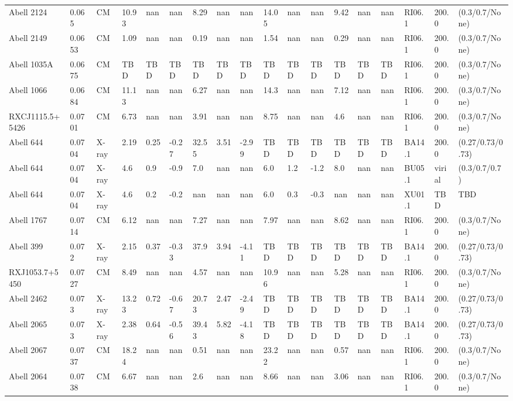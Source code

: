 \documentclass{article}
\begin{document}
\begin{center}
\begin{landscape}
\begin{longtable}{llllllllllllllllll}
Abell 2124 & 0.065 & CM & 10.93 & nan & nan & 8.29 & nan & nan & 14.05 & nan & nan & 9.42 & nan & nan & RI06.1 & 200.0 & (0.3/0.7/None) \\
Abell 2149 & 0.0653 & CM & 1.09 & nan & nan & 0.19 & nan & nan & 1.54 & nan & nan & 0.29 & nan & nan & RI06.1 & 200.0 & (0.3/0.7/None) \\
Abell 1035A & 0.0675 & CM & TBD & TBD & TBD & TBD & TBD & TBD & TBD & TBD & TBD & TBD & TBD & TBD & RI06.1 & 200.0 & (0.3/0.7/None) \\
Abell 1066 & 0.0684 & CM & 11.13 & nan & nan & 6.27 & nan & nan & 14.3 & nan & nan & 7.12 & nan & nan & RI06.1 & 200.0 & (0.3/0.7/None) \\
RXCJ1115.5+5426 & 0.0701 & CM & 6.73 & nan & nan & 3.91 & nan & nan & 8.75 & nan & nan & 4.6 & nan & nan & RI06.1 & 200.0 & (0.3/0.7/None) \\
Abell 644 & 0.0704 & X-ray & 2.19 & 0.25 & -0.27 & 32.55 & 3.51 & -2.99 & TBD & TBD & TBD & TBD & TBD & TBD & BA14.1 & 200.0 & (0.27/0.73/0.73) \\
Abell 644 & 0.0704 & X-ray & 4.6 & 0.9 & -0.9 & 7.0 & nan & nan & 6.0 & 1.2 & -1.2 & 8.0 & nan & nan & BU05.1 & virial & (0.3/0.7/0.7) \\
Abell 644 & 0.0704 & X-ray & 4.6 & 0.2 & -0.2 & nan & nan & nan & 6.0 & 0.3 & -0.3 & nan & nan & nan & XU01.1 & TBD & TBD \\
Abell 1767 & 0.0714 & CM & 6.12 & nan & nan & 7.27 & nan & nan & 7.97 & nan & nan & 8.62 & nan & nan & RI06.1 & 200.0 & (0.3/0.7/None) \\
Abell 399 & 0.072 & X-ray & 2.15 & 0.37 & -0.33 & 37.9 & 3.94 & -4.11 & TBD & TBD & TBD & TBD & TBD & TBD & BA14.1 & 200.0 & (0.27/0.73/0.73) \\
RXJ1053.7+5450 & 0.0727 & CM & 8.49 & nan & nan & 4.57 & nan & nan & 10.96 & nan & nan & 5.28 & nan & nan & RI06.1 & 200.0 & (0.3/0.7/None) \\
Abell 2462 & 0.073 & X-ray & 13.23 & 0.72 & -0.67 & 20.73 & 2.47 & -2.49 & TBD & TBD & TBD & TBD & TBD & TBD & BA14.1 & 200.0 & (0.27/0.73/0.73) \\
Abell 2065 & 0.073 & X-ray & 2.38 & 0.64 & -0.56 & 39.43 & 5.82 & -4.18 & TBD & TBD & TBD & TBD & TBD & TBD & BA14.1 & 200.0 & (0.27/0.73/0.73) \\
Abell 2067 & 0.0737 & CM & 18.24 & nan & nan & 0.51 & nan & nan & 23.22 & nan & nan & 0.57 & nan & nan & RI06.1 & 200.0 & (0.3/0.7/None) \\
Abell 2064 & 0.0738 & CM & 6.67 & nan & nan & 2.6 & nan & nan & 8.66 & nan & nan & 3.06 & nan & nan & RI06.1 & 200.0 & (0.3/0.7/None) \\

\end{longtable}
\end{landscape}
\end{center}
\end{document}
